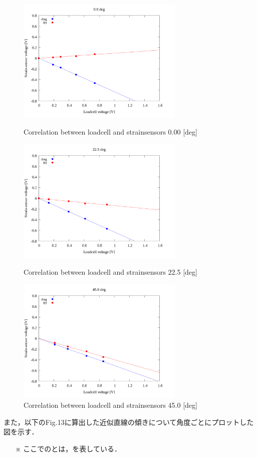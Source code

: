 \documentclass[twocolumn,a4j]{jsarticle}
\begin{document}
\begin{figure}[htbp]
    \footnotesize
    \begin{center}
        \includegraphics[width=80mm]{../images_2/04/04_linear_0.png}
        \caption{Correlation between loadcell and strainsensors 0.00 [deg]}
        \includegraphics[width=80mm]{../images_2/04/04_linear_225.png}
        \caption{Correlation between loadcell and strainsensors 22.5 [deg]}
        \includegraphics[width=80mm]{../images_2/04/04_linear_450.png}
        \caption{Correlation between loadcell and strainsensors 45.0 [deg]}
    \end{center}
\end{figure}

また，以下のFig.13に算出した近似直線の傾きについて角度ごとにプロットした図を示す．
\begin{itemize}
    \item [※] ここでのとは，を表している．
\end{itemize}
\end{document}
